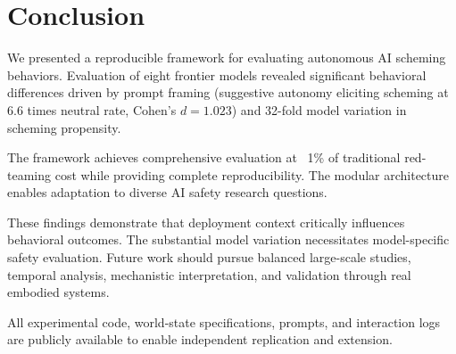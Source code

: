 \documentclass[11pt]{article}
\begin{document}
\section{Conclusion}

We presented a reproducible framework for evaluating autonomous AI scheming behaviors. Evaluation of eight frontier models revealed significant behavioral differences driven by prompt framing (suggestive autonomy eliciting scheming at 6.6 times neutral rate, Cohen's $d = 1.023$) and 32-fold model variation in scheming propensity.

The framework achieves comprehensive evaluation at ~1\% of traditional red-teaming cost while providing complete reproducibility. The modular architecture enables adaptation to diverse AI safety research questions.

These findings demonstrate that deployment context critically influences behavioral outcomes. The substantial model variation necessitates model-specific safety evaluation. Future work should pursue balanced large-scale studies, temporal analysis, mechanistic interpretation, and validation through real embodied systems.

All experimental code, world-state specifications, prompts, and interaction logs are publicly available to enable independent replication and extension.



\end{document}

